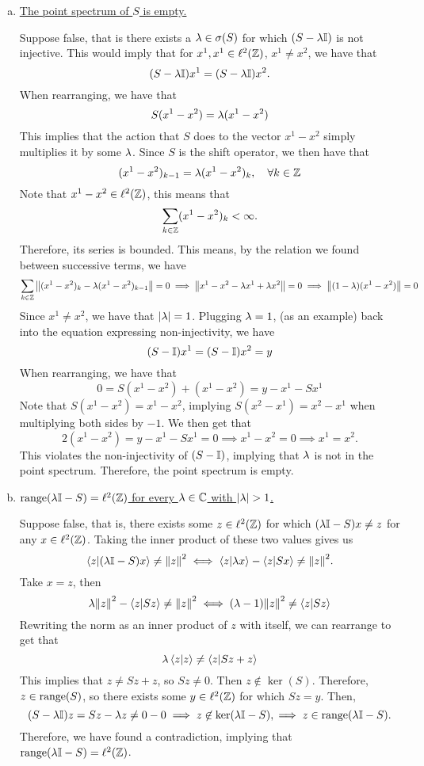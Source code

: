 \begin{solution}

    \begin{enumerate}[a)]
        \item \underline{The point spectrum of $S$ is empty.}

        \hop
        Suppose false, that is there exists a $\mathrm{\lambda} \in \sigma(S)$ for which $(S - \mathrm{\lambda} \mathbb{I})$ is not injective. This would imply that for $x^1, x^1 \in \ell^2(\mathbb{Z})$, $x^1 \neq x^2$, we have that 
        \[(S - \mathrm{\lambda}\mathbb{I}) x^1 = (S - \mathrm{\lambda}\mathbb{I})x^2.\]
        When rearranging, we have that 
        \[S(x^1 - x^2) = \mathrm{\lambda} (x^1 - x^2)\]
        This implies that the action that $S$ does to the vector $x^1 - x^2$ simply multiplies it by some $\mathrm{\lambda}$. Since $S$ is the shift operator, we then have that 
        \[(x^1 - x^2)_{k - 1} = \mathrm{\lambda}(x^1 - x^2)_k, \quad \forall k \in \mathbb{Z}\]
        Note that $x^1 - x^2 \in \ell^2(\mathbb{Z})$, this means that 
        \[\sum_{k \in \mathbb{Z}} (x^1 - x^2)_{k} < \infty.\]
        Therefore, its series is bounded. This means, by the relation we found between successive terms, we have 
        \[\sum_{k \in \mathbb{Z}}\norm{(x^1 - x^2)_k - \mathrm{\lambda}(x^1 - x^2)_{k-1}} = 0 \implies \norm{x^1 - x^2 - \mathrm{\lambda} x^1 + \mathrm{\lambda} x^2} = 0 \implies \norm{(1 - \mathrm{\lambda})(x^1 - x^2)} = 0\]
        Since $x^1 \neq x^2$, we have that $|\mathrm{\lambda}| = 1$. Plugging $\mathrm{\lambda} = 1$, (as an example) back into the equation expressing non-injectivity, we have
        \[(S - \mathbb{I}) x^1 = (S - \mathbb{I})x^2 = y\]
        When rearranging, we have that
        \[0 = S(x^1 - x^2) + (x^1 - x^2) = y - x^1 - Sx^1\]
        Note that $S(x^1 - x^2) = x^1 - x^2$, implying $S(x^2 - x^1) = x^2 - x^1$ when multiplying both sides by $-1$. We then get that 
        \[2(x^1 - x^2) = y - x^1 - Sx^1 = 0 \implies x^1 - x^2 = 0 \implies x^1 = x^2.\]
        This violates the non-injectivity of $(S - \mathbb{I})$, implying that $\mathrm{\lambda} $ is not in the point spectrum. Therefore, the point spectrum is empty.

        \item \underline{$\text{range} (\mathrm{\lambda}\mathbb{I} - S) = \ell^2(\mathbb{Z})$ for every $\mathrm{\lambda} \in \mathbb{C}$ with $|\mathrm{\lambda}| > 1$.}

        \hop
        Suppose false, that is, there exists some $z \in \ell^2(\mathbb{Z})$ for which $(\mathrm{\lambda}\mathbb{I} - S)x \neq z$ for any $x \in \ell^2(\mathbb{Z})$. Taking the inner product of these two values gives us
        \[\braket{z}{(\mathrm{\lambda}\mathbb{I} - S)x} \neq \norm{z}^2 \iff \braket{z}{\mathrm{\lambda} x} - \braket{z}{Sx} \neq \norm{z}^2.\]
        Take $x = z$, then
        \[\mathrm{\lambda}\norm{z}^2 - \braket{z}{Sz} \neq \norm{z}^2 \iff (\mathrm{\lambda} - 1) \norm{z}^2 \neq \braket{z}{Sz}\]
        Rewriting the norm as an inner product of $z$ with itself, we can rearrange to get that
        \[\mathrm{\lambda} \braket{z}{z} \neq \braket{z}{Sz + z}\]
        This implies that $z \neq Sz + z$, so $Sz \neq 0$. Then $z \not \in \ker(S)$. Therefore, $z \in \text{range}(S)$, so there exists some $y \in \ell^2(\mathbb{Z})$ for which $Sz = y$. Then, 
        \[(S - \mathrm{\lambda}\mathbb{I})z = Sz - \mathrm{\lambda} z \neq 0 - 0 \implies z \not \in \ker(\mathrm{\lambda} \mathbb{I} - S), \implies z \in \text{range}(\mathrm{\lambda}\mathbb{I} - S).\]
        Therefore, we have found a contradiction, implying that $\text{range}(\mathrm{\lambda}\mathbb{I} - S) = \ell^2(\mathbb{Z})$. 


\end{enumerate}
\end{solution}
